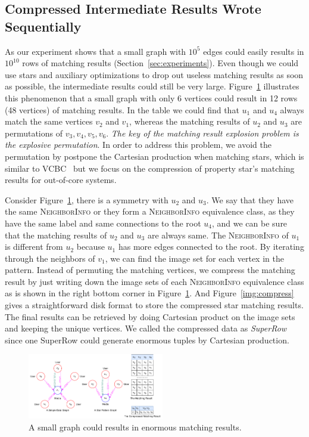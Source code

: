 \subsection{Compressed Intermediate Results Wrote Sequentially}\label{sec:match_compress}
As our experiment shows that a small graph with $10^5$ edges could easily results in $10^{10}$ rows of matching results (Section~\ref{sec:experiments}).
Even though we could use stars and auxiliary optimizations to drop out useless matching results as soon as possible, the intermediate results could still be very large.
Figure~\ref{img:compress_example} illustrates this phenomenon that a small graph with only 6 vertices could result in 12 rows (48 vertices) of matching results.
In the table we could find that $u_1$ and $u_4$ always match the same vertices $v_2$ and $v_1$,
whereas the matching results of $u_2$ and $u_3$ are permutations of $v_3, v_4, v_5, v_6$.
\emph{The key of the matching result explosion problem is the explosive permutation}.
In order to address this problem, we avoid the permutation by postpone the Cartesian production when matching stars, which is similar to VCBC~\cite{DBLP:journals/pvldb/QiaoZC17} but we focus on the compression of property star's matching results for out-of-core systems.

Consider Figure~\ref{img:compress_example}, there is a symmetry with $u_2$ and $u_3$.
We say that they have the same \textsc{NeighborInfo} or they form a \textsc{NeighborInfo} equivalence class, as they have the same label and same connections to the root $u_4$,
and we can be sure that the matching results of $u_2$ and $u_3$ are always same.
The \textsc{NeighborInfo} of $u_1$ is different from $u_2$ because $u_1$ has more edges connected to the root.
By iterating through the neighbors of $v_1$, we can find the image set for each vertex in the pattern.
Instead of permuting the matching vertices, we compress the matching result by just writing down the image sets of each \textsc{NeighborInfo} equivalence class as is shown in the right bottom corner in Figure~\ref{img:compress_example}.
And Figure~\ref{img:compress} gives a straightforward disk format to store the compressed star matching results.
The final results can be retrieved by doing Cartesian product on the image sets and keeping the unique vertices.
We called the compressed data as \emph{SuperRow} since one SuperRow could generate enormous tuples by Cartesian production.
\begin{figure}[ht]
  \centering
  \includegraphics[width=0.53\textwidth]{img/compress_example.pdf}
  \caption{A small graph could results in enormous matching results.}\label{img:compress_example}
\end{figure}

